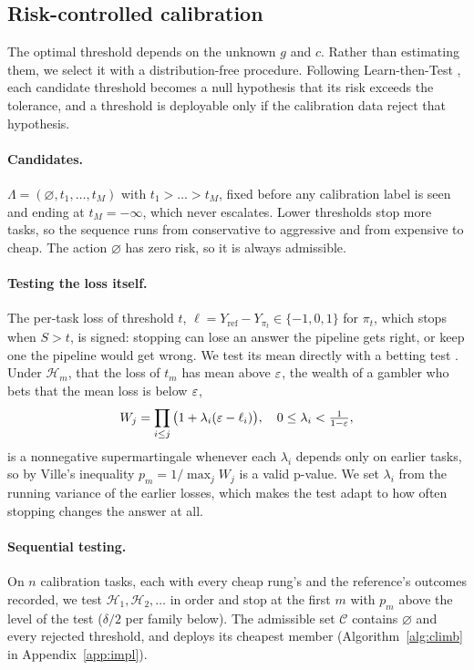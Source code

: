 \subsection{Risk-controlled calibration}
\label{sec:calib}

The optimal threshold depends on the unknown $g$ and $c$. Rather than estimating them, we select it
with a distribution-free procedure. Following Learn-then-Test \citep{angelopoulos2021ltt}, each
candidate threshold becomes a null hypothesis that its risk exceeds the tolerance, and a threshold
is deployable only if the calibration data reject that hypothesis.

\paragraph{Candidates.} $\Lambda = (\varnothing, t_1, \dots, t_M)$ with $t_1 > \dots > t_M$, fixed
before any calibration label is seen and ending at $t_M = -\infty$, which never escalates. Lower thresholds stop more tasks, so the sequence runs from conservative to aggressive and
from expensive to cheap. The action $\varnothing$ has zero risk, so it is always admissible.

\paragraph{Testing the loss itself.} The per-task loss of threshold $t$,
$\ell = Y_{\mathrm{ref}} - Y_{\pi_t} \in \{-1, 0, 1\}$ for $\pi_t$, which stops when $S > t$, is signed: stopping can lose an
answer the pipeline gets right, or keep one the pipeline would get wrong.
We test its mean directly with a betting test \citep{waudbysmith2024betting}. Under
$\mathcal{H}_m$, that the loss of $t_m$ has mean above $\varepsilon$, the wealth of a gambler who bets that the mean loss is below $\varepsilon$,
\begin{equation}
  W_j = \prod_{i \le j} \big(1 + \lambda_i (\varepsilon - \ell_i)\big), \quad 0 \le \lambda_i < \tfrac{1}{1 - \varepsilon},
\end{equation}
is a nonnegative supermartingale whenever each $\lambda_i$ depends only on earlier tasks, so by
Ville's inequality \citep{ville1939} $p_m = 1 / \max_j W_j$ is a valid p-value. We set $\lambda_i$
from the running variance of the earlier losses, which makes the test adapt to how often stopping
changes the answer at all.

\paragraph{Sequential testing.} On $n$ calibration tasks, each with every cheap rung's and the
reference's outcomes recorded, we test $\mathcal{H}_1, \mathcal{H}_2, \dots$ in order and stop at the
first $m$ with $p_m$ above the level of the test ($\delta/2$ per family below). The admissible set $\mathcal{C}$ contains $\varnothing$ and every
rejected threshold, and \climb{} deploys its cheapest member (Algorithm~\ref{alg:climb} in
Appendix~\ref{app:impl}).

